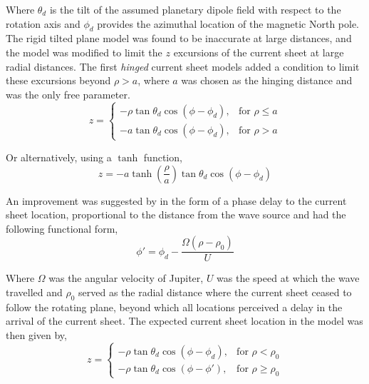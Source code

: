 Where $\theta_d$ is the tilt of the assumed planetary dipole field with respect to the rotation axis and $\phi_d$ provides the azimuthal location of the magnetic North pole. The rigid tilted plane model was found to be inaccurate at large distances, and the model was modified to limit the $z$ excursions of the current sheet at large radial distances. The first \emph{hinged} current sheet models \cite{Smith1974The10,Hill1974ConfigurationMagnetosphere} added a condition to limit these excursions beyond $\rho > a$, where $a$ was chosen as the hinging distance and was the only free parameter.
\begin{equation}
    z = \begin{cases}
    -\rho \tan\theta_d \cos\left(\phi - \phi_d\right), & \text{for } \rho \leq a\\
    -a \tan\theta_d \cos\left(\phi - \phi_d\right), & \text{for } \rho > a
    \end{cases}
\end{equation}

Or alternatively, using a $\tanh$ function, 
\begin{equation}
    z = -a \tanh\left(\frac{\rho}{a}\right) \tan\theta_d \cos\left(\phi - \phi_d\right)
\end{equation}

An improvement was suggested by  in the form of a phase delay to the current sheet location, proportional to the distance from the wave source and had the following functional form,
\begin{equation}
    \phi' = \phi_d - \frac{\Omega \left( \rho - \rho_0\right)}{U}
\end{equation}

Where $\Omega$ was the angular velocity of Jupiter, $U$ was the speed at which the wave travelled and $\rho_0$ served as the radial distance where the current sheet ceased to follow the rotating plane, beyond which all locations perceived a delay in the arrival of the current sheet. The expected current sheet location in the  model was then given by,
\begin{equation}
    z = \begin{cases}
    -\rho \tan\theta_d \cos\left(\phi - \phi_d\right), & \text{for } \rho < \rho_0\\
    -\rho \tan\theta_d \cos\left(\phi - \phi'\right),  & \text{for } \rho \geq \rho_0
    \end{cases}
    \label{eqn:kivelson1978}
\end{equation}

